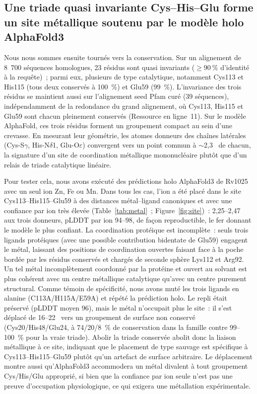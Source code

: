 \documentclass[11pt,a4paper]{article}
\newcommand{\ang}{\text{\AA}}
\begin{document}
\subsection{Une triade quasi invariante Cys--His--Glu forme un site métallique soutenu par le modèle holo AlphaFold3}

Nous nous sommes ensuite tournés vers la conservation. Sur un alignement de 8~700 séquences homologues, 23 résidus sont quasi invariants ($\geq 90~\%$ d'identité à la requête)~; parmi eux, plusieurs de type catalytique, notamment Cys113 et His115 (tous deux conservés à 100~\%) et Glu59 (99~\%). L'invariance des trois résidus se maintient aussi sur l'alignement seed Pfam curé (39 séquences), indépendamment de la redondance du grand alignement, où Cys113, His115 et Glu59 sont chacun pleinement conservés (Ressource en ligne~11). Sur le modèle AlphaFold, ces trois résidus forment un groupement compact au sein d'une crevasse. En mesurant leur géométrie, les atomes donneurs des chaînes latérales (Cys-S$\gamma$, His-N$\delta$1, Glu-O$\varepsilon$) convergent vers un point commun à $\sim$2,3~\ang{} de chacun, la signature d'un site de coordination métallique mononucléaire plutôt que d'un relais de triade catalytique linéaire.

Pour tester cela, nous avons exécuté des prédictions holo AlphaFold3 de Rv1025 avec un seul ion Zn, Fe ou Mn. Dans tous les cas, l'ion a été placé dans le site Cys113--His115--Glu59 à des distances métal--ligand canoniques et avec une confiance par ion très élevée (Table~\ref{tab:metal}~; Figure~\ref{fig:site})~: 2,25--2,47~\ang{} aux trois donneurs, pLDDT par ion 94--98, de façon reproductible, le fer donnant le modèle le plus confiant. La coordination protéique est incomplète~: seuls trois ligands protéiques (avec une possible contribution bidentate de Glu59) engagent le métal, laissant des positions de coordination ouvertes faisant face à la poche bordée par les résidus conservés et chargés de seconde sphère Lys112 et Arg92. Un tel métal incomplètement coordonné par la protéine et ouvert au solvant est plus cohérent avec un centre métallique catalytique qu'avec un centre purement structural. Comme témoin de spécificité, nous avons muté les trois ligands en alanine (C113A/H115A/E59A) et répété la prédiction holo. Le repli était préservé (pLDDT moyen 96), mais le métal n'occupait plus le site~: il s'est déplacé de 16--22~\ang{} vers un groupement de surface non conservé (Cys20/His48/Glu24, à 74/20/8~\% de conservation dans la famille contre 99--100~\% pour la vraie triade). Abolir la triade conservée abolit donc la liaison métallique à ce site, indiquant que le placement de type sauvage est spécifique à Cys113--His115--Glu59 plutôt qu'un artefact de surface arbitraire. Le déplacement montre aussi qu'AlphaFold3 accommodera un métal divalent à tout groupement Cys/His/Glu approprié, si bien que la confiance par ion seule n'est pas une preuve d'occupation physiologique, ce qui exigera une métallation expérimentale.
\end{document}
